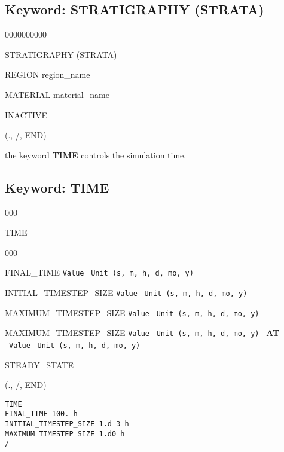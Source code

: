 \documentclass[12pt]{article}
\begin{document}

\newpage
\protect\hypertarget{target_strata}{}

\subsection{Keyword: STRATIGRAPHY (STRATA)}
\begin{deflist}{0000000000}
\item[STRATIGRAPHY (STRATA)]
\item  REGION region\_name
\item  MATERIAL material\_name
\item  INACTIVE
\item[(., /, END)]
\end{deflist}


\newpage
\protect\hypertarget{target_time}{}

 the keyword {\bf TIME} controls the simulation time.

\subsection{Keyword: TIME}
\begin{deflist}{000}
\item[TIME] ~
\begin{deflist}{000}
\item[FINAL\_TIME] {\tt Value} \ {\tt Unit (s, m, h, d, mo, y)}
\item[INITIAL\_TIMESTEP\_SIZE] {\tt Value} \ {\tt Unit (s, m, h, d, mo, y)}
\item[MAXIMUM\_TIMESTEP\_SIZE] {\tt Value} \ {\tt Unit (s, m, h, d, mo, y)}
\item[MAXIMUM\_TIMESTEP\_SIZE] {\tt Value} \ {\tt Unit (s, m, h, d, mo, y)} \ {\bf AT} \ {\tt Value} \ {\tt Unit (s, m, h, d, mo, y)}
\item[STEADY\_STATE]
\end{deflist}
\item[(., /, END)]
\end{deflist}


\begin{verbatim}
TIME
FINAL_TIME 100. h
INITIAL_TIMESTEP_SIZE 1.d-3 h
MAXIMUM_TIMESTEP_SIZE 1.d0 h
/
\end{verbatim}
\end{document}
